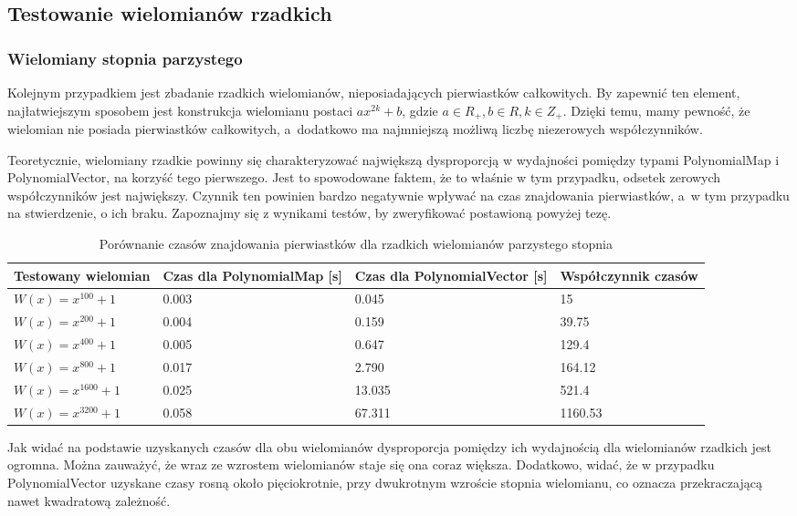 \subsection{Testowanie wielomianów rzadkich}

\subsubsection{Wielomiany stopnia parzystego}

Kolejnym przypadkiem jest zbadanie rzadkich wielomianów, nieposiadających pierwiastków całkowitych. By zapewnić ten element, najłatwiejszym sposobem jest konstrukcja wielomianu postaci $ax^{2k}+b$, gdzie $a \in R_+, b \in R, k \in Z_+$. Dzięki temu, mamy pewność, że wielomian nie posiada pierwiastków całkowitych, a~dodatkowo ma najmniejszą możliwą liczbę niezerowych współczynników.

Teoretycznie, wielomiany rzadkie powinny się charakteryzować największą dysproporcją w wydajności pomiędzy typami PolynomialMap i PolynomialVector, na korzyść tego pierwszego. Jest to spowodowane faktem, że to właśnie w tym przypadku, odsetek zerowych współczynników jest największy. Czynnik ten powinien bardzo negatywnie wpływać na czas znajdowania pierwiastków, a~w tym przypadku na stwierdzenie, o ich braku. Zapoznajmy się z wynikami testów, by zweryfikować postawioną powyżej tezę.

\begin{table}[H]
	\begin{tabular}{ |p{3.5cm}|p{3cm}|p{3cm}|p{3.5cm}|} 
		\hline
		Testowany wielomian & Czas dla PolynomialMap [s] & Czas dla PolynomialVector [s] & Współczynnik czasów \\
		\hline
		$W(x) = x^{100} + 1$ & 0.003 & 0.045 & 15 \\
		$W(x) = x^{200} + 1$ & 0.004 & 0.159 & 39.75 \\
		$W(x) = x^{400} + 1$ & 0.005 & 0.647 & 129.4 \\
		$W(x) = x^{800} + 1$ & 0.017 & 2.790 & 164.12 \\
		$W(x) = x^{1600} + 1$ & 0.025 & 13.035 & 521.4 \\
		$W(x) = x^{3200} + 1$ & 0.058 & 67.311 & 1160.53 \\
		\hline
	\end{tabular}
	\caption{Porównanie czasów znajdowania pierwiastków dla rzadkich wielomianów parzystego stopnia}
\end{table}

Jak widać na podstawie uzyskanych czasów dla obu wielomianów dysproporcja pomiędzy ich wydajnością dla wielomianów rzadkich jest ogromna. Można zauważyć, że wraz ze wzrostem wielomianów staje się ona coraz większa. Dodatkowo, widać, że w przypadku PolynomialVector uzyskane czasy rosną około pięciokrotnie, przy dwukrotnym wzroście stopnia wielomianu, co oznacza przekraczającą nawet kwadratową zależność.

